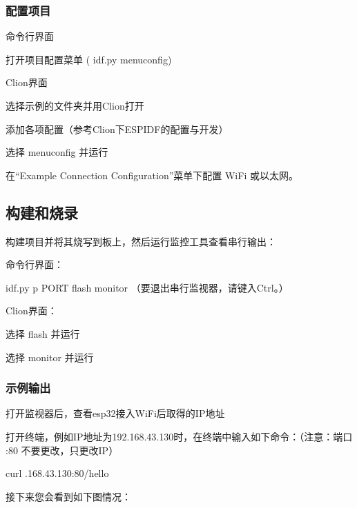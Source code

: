 \documentclass[a4paper,12pt,english]{sphinxmanual}
\begin{document}
{{\subsubsection{配置项目}
\label{\detokenize{exp-esp32/http:id3}}
\sphinxAtStartPar
命令行界面

\sphinxAtStartPar
打开项目配置菜单 ( idf.py menuconfig)

\sphinxAtStartPar
Clion界面

\sphinxAtStartPar
选择示例的文件夹并用Clion打开

\sphinxAtStartPar
添加各项配置（参考Clion下ESP\sphinxhyphen{}IDF的配置与开发）

\sphinxAtStartPar
选择 menuconfig 并运行

\sphinxAtStartPar
在“Example Connection Configuration”菜单下配置 Wi\sphinxhyphen{}Fi 或以太网。


\subsection{构建和烧录}
\label{\detokenize{exp-esp32/http:id4}}
\sphinxAtStartPar
构建项目并将其烧写到板上，然后运行监控工具查看串行输出：

\sphinxAtStartPar
命令行界面：

\sphinxAtStartPar
idf.py \sphinxhyphen{}p PORT flash monitor
（要退出串行监视器，请键入Ctrl\sphinxhyphen{}{]}。）

\sphinxAtStartPar
Clion界面：

\sphinxAtStartPar
选择 flash 并运行

\sphinxAtStartPar
选择 monitor 并运行


\subsubsection{示例输出}
\label{\detokenize{exp-esp32/http:id5}}
\sphinxAtStartPar
打开监视器后，查看esp32接入WiFi后取得的IP地址

\sphinxAtStartPar
打开终端，例如IP地址为192.168.43.130时，在终端中输入如下命令：（注意：端口  :80  不要更改，只更改IP）

\begin{sphinxVerbatim}[commandchars=\\\{\}]
curl .168.43.130:80/hello
\end{sphinxVerbatim}

\sphinxAtStartPar
接下来您会看到如下图情况：

\sphinxAtStartPar
{}

}}
\end{document}
